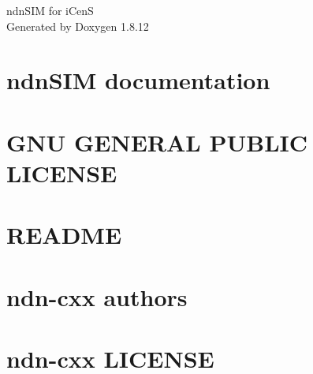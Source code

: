 \documentclass[twoside]{book}
\newcommand{\+}{\discretionary{\mbox{\scriptsize$\hookleftarrow$}}{}{}}
\newcommand{\clearemptydoublepage}{%
  \newpage{\pagestyle{empty}\cleardoublepage}%
}
\begin{document}
\hypersetup{pageanchor=false,
             bookmarksnumbered=true,
             pdfencoding=unicode
            }
\begin{titlepage}
\vspace*{7cm}
\begin{center}%
{\Large ndn\+S\+IM for i\+CenS }\\
\vspace*{1cm}
{\large Generated by Doxygen 1.8.12}\\
\end{center}
\end{titlepage}
\clearemptydoublepage
{}
\tableofcontents
\clearemptydoublepage
{}
\hypersetup{pageanchor=true}

\chapter{ndn\+S\+IM documentation}
\label{index}\hypertarget{index}{}
\chapter{G\+NU G\+E\+N\+E\+R\+AL P\+U\+B\+L\+IC L\+I\+C\+E\+N\+SE}
\label{md__home_network_NSOL_ndnSIM-dev_ns-3_src_ndnSIM_COPYING}
\hypertarget{md__home_network_NSOL_ndnSIM-dev_ns-3_src_ndnSIM_COPYING}{}

\chapter{R\+E\+A\+D\+ME}
\label{md__home_network_NSOL_ndnSIM-dev_ns-3_src_ndnSIM_examples_README}
\hypertarget{md__home_network_NSOL_ndnSIM-dev_ns-3_src_ndnSIM_examples_README}{}

\chapter{ndn-\/cxx authors}
\label{md__home_network_NSOL_ndnSIM-dev_ns-3_src_ndnSIM_ndn-cxx_AUTHORS}
\hypertarget{md__home_network_NSOL_ndnSIM-dev_ns-3_src_ndnSIM_ndn-cxx_AUTHORS}{}

\chapter{ndn-\/cxx L\+I\+C\+E\+N\+SE}
\label{md__home_network_NSOL_ndnSIM-dev_ns-3_src_ndnSIM_ndn-cxx_COPYING}
\hypertarget{md__home_network_NSOL_ndnSIM-dev_ns-3_src_ndnSIM_ndn-cxx_COPYING}{}

\end{document}

